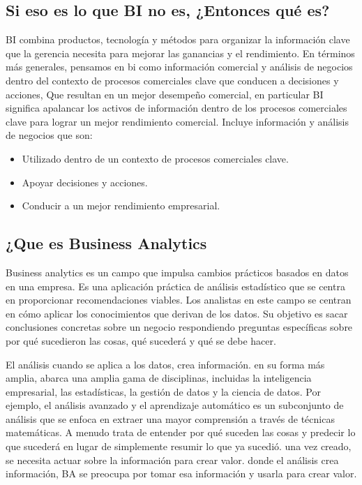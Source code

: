 \documentclass[twoside,twocolumn]{article}
\begin{document}
\subsection{Si eso es lo que BI no es, ¿Entonces qué es?}
BI combina productos, tecnología y métodos para organizar la información clave que la gerencia necesita para mejorar las ganancias y el rendimiento. En términos más generales, pensamos en bi como información comercial y análisis de negocios dentro del contexto de procesos comerciales clave que conducen a decisiones y acciones, Que resultan en un mejor desempeño comercial, en particular BI significa apalancar los activos de información dentro de los procesos comerciales clave para lograr un mejor rendimiento comercial. Incluye información y análisis de negocios que son:

\begin{itemize}	
	\item Utilizado dentro de un contexto de procesos comerciales clave.
	\item Apoyar decisiones y acciones.
	\item Conducir a un mejor rendimiento empresarial.

\end{itemize} 

\subsection{¿Que es Business Analytics}

Business analytics es un campo que impulsa cambios prácticos basados en datos en una empresa. Es una aplicación práctica de análisis estadístico que se centra en proporcionar recomendaciones viables. Los analistas en este campo se centran en cómo aplicar los conocimientos que derivan de los datos. Su objetivo es sacar conclusiones concretas sobre un negocio respondiendo preguntas específicas sobre por qué sucedieron las cosas, qué sucederá y qué se debe hacer.
 
El análisis cuando se aplica a los datos, crea información. en su forma más amplia, abarca una amplia gama de disciplinas, incluidas la inteligencia empresarial, las estadísticas, la gestión de datos y la ciencia de datos. Por ejemplo, el análisis avanzado y el aprendizaje automático es un subconjunto de análisis que se enfoca en extraer una mayor comprensión a través de técnicas matemáticas. A menudo trata de entender por qué suceden las cosas y predecir lo que sucederá en lugar de simplemente resumir lo que ya sucedió. una vez creado, se necesita actuar sobre la información para crear valor. donde el análisis crea información, BA se preocupa por tomar esa información y usarla para crear valor.
\end{document}
